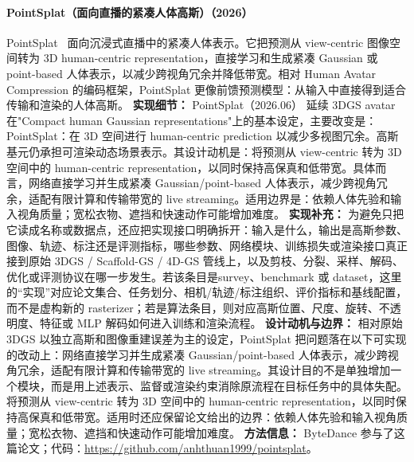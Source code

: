 \paragraph{PointSplat（面向直播的紧凑人体高斯）（2026）}

PointSplat~\cite{2606_32036} 面向沉浸式直播中的紧凑人体表示。它把预测从 view-centric 图像空间转为 3D human-centric representation，直接学习和生成紧凑 Gaussian 或 point-based 人体表示，以减少跨视角冗余并降低带宽。相对 Human Avatar Compression 的编码框架，PointSplat 更像前馈预测模型：从输入中直接得到适合传输和渲染的人体高斯。
\textbf{实现细节：} PointSplat（2026.06） 延续 3DGS avatar 在"Compact human Gaussian representations"上的基本设定，主要改变是：PointSplat：在 3D 空间进行 human-centric prediction 以减少多视图冗余。高斯基元仍承担可渲染动态场景表示。其设计动机是：将预测从 view-centric 转为 3D 空间中的 human-centric representation，以同时保持高保真和低带宽。具体而言，网络直接学习并生成紧凑 Gaussian/point-based 人体表示，减少跨视角冗余，适配有限计算和传输带宽的 live streaming。适用边界是：依赖人体先验和输入视角质量；宽松衣物、遮挡和快速动作可能增加难度。
\textbf{实现补充：} 为避免只把它读成名称或数据点，还应把实现接口明确拆开：输入是什么，输出是高斯参数、图像、轨迹、标注还是评测指标，哪些参数、网络模块、训练损失或渲染接口真正接到原始 3DGS / Scaffold-GS / 4D-GS 管线上，以及剪枝、分裂、采样、解码、优化或评测协议在哪一步发生。若该条目是survey、benchmark 或 dataset，这里的“实现”对应论文集合、任务划分、相机/轨迹/标注组织、评价指标和基线配置，而不是虚构新的 rasterizer；若是算法条目，则对应高斯位置、尺度、旋转、不透明度、特征或 MLP 解码如何进入训练和渲染流程。
\textbf{设计动机与边界：} 相对原始 3DGS 以独立高斯和图像重建误差为主的设定，PointSplat 把问题落在以下可实现的改动上：网络直接学习并生成紧凑 Gaussian/point-based 人体表示，减少跨视角冗余，适配有限计算和传输带宽的 live streaming。其设计目的不是单独增加一个模块，而是用上述表示、监督或渲染约束消除原流程在目标任务中的具体失配。将预测从 view-centric 转为 3D 空间中的 human-centric representation，以同时保持高保真和低带宽。适用时还应保留论文给出的边界：依赖人体先验和输入视角质量；宽松衣物、遮挡和快速动作可能增加难度。
\textbf{方法信息：} ByteDance 参与了这篇论文；代码：\url{https://github.com/anhthuan1999/pointsplat}。
